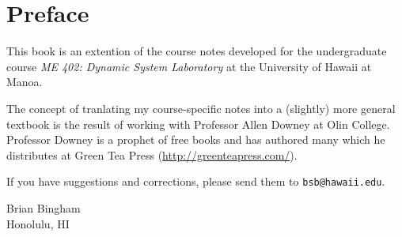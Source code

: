 \chapter{Preface}

This book is an extention of the course notes developed for the undergraduate course \emph{ME 402: Dynamic System Laboratory} at the University of Hawaii at Manoa.  

The concept of tranlating my course-specific notes into a (slightly) more general textbook is the result of working with Professor Allen Downey at Olin College.  Professor Downey is a prophet of free books and has authored many which he distributes at Green Tea Press (\url{http://greenteapress.com/}).

If you have suggestions and corrections, please send them to
{\tt bsb@hawaii.edu}.

\vspace{0.25in}

\noindent Brian Bingham \\
\noindent Honolulu, HI 
